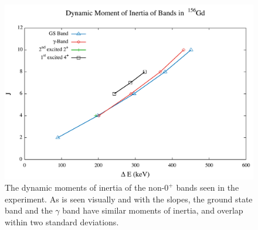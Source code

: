 \begin{figure}[!]
    \centering
    \includegraphics[scale=0.45]{156GdTablesAndFigs/156_Dynamic.pdf}
    \caption{The dynamic moments of inertia of the non-$0^+$ bands seen in the experiment. As is seen visually and with the slopes, the ground state band and the $\gamma$ band have similar moments of inertia, and overlap within two standard deviations.}
    \label{fig:156_Dynamic}
\end{figure}